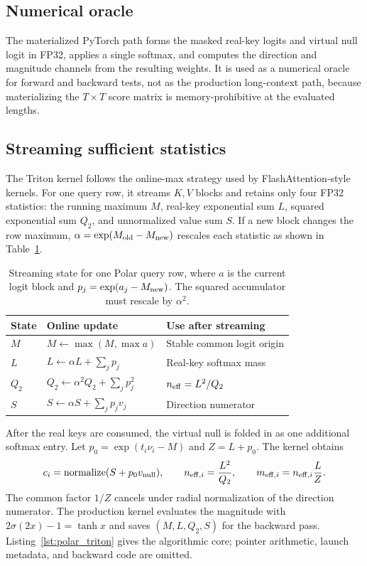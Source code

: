 \subsection{Numerical oracle}
The materialized PyTorch path forms the masked real-key logits and virtual null logit in FP32, applies a single softmax, and computes the direction and magnitude channels from the resulting weights. It is used as a numerical oracle for forward and backward tests, not as the production long-context path, because materializing the $T\times T$ score matrix is memory-prohibitive at the evaluated lengths.

\subsection{Streaming sufficient statistics}
The Triton kernel follows the online-max strategy used by FlashAttention-style kernels. For one query row, it streams $K,V$ blocks and retains only four FP32 statistics: the running maximum $M$, real-key exponential sum $L$, squared exponential sum $Q_2$, and unnormalized value sum $S$. If a new block changes the row maximum, $\alpha=\exp(M_{\rm old}-M_{\rm new})$ rescales each statistic as shown in Table~\ref{table:polar_streaming_state}.

\begin{table}[!ht]
\centering
\small
\begin{tabular}{lll}
\toprule
\textbf{State} & \textbf{Online update} & \textbf{Use after streaming} \\
\midrule
$M$ & $M\leftarrow\max(M,\max a)$ & Stable common logit origin \\
$L$ & $L\leftarrow\alpha L+\sum_jp_j$ & Real-key softmax mass \\
$Q_2$ & $Q_2\leftarrow\alpha^2Q_2+\sum_jp_j^2$ & $n_{\rm eff}=L^2/Q_2$ \\
$S$ & $S\leftarrow\alpha S+\sum_jp_jv_j$ & Direction numerator \\
\bottomrule
\end{tabular}
\caption{Streaming state for one Polar query row, where $a$ is the current logit block and $p_j=\exp(a_j-M_{\rm new})$. The squared accumulator must rescale by $\alpha^2$.}
\label{table:polar_streaming_state}
\end{table}

After the real keys are consumed, the virtual null is folded in as one additional softmax entry. Let $p_0=\exp(t_i\nu_i-M)$ and $Z=L+p_0$. The kernel obtains
\begin{equation}
c_i=\operatorname{normalize}(S+p_0v_{\rm null}),\qquad
n_{{\rm eff},i}=\frac{L^2}{Q_2},\qquad
m_{{\rm eff},i}=n_{{\rm eff},i}\frac{L}{Z}.
\end{equation}
The common factor $1/Z$ cancels under radial normalization of the direction numerator. The production kernel evaluates the magnitude with $2\sigma(2x)-1=\tanh x$ and saves $(M,L,Q_2,S)$ for the backward pass. Listing~\ref{lst:polar_triton} gives the algorithmic core; pointer arithmetic, launch metadata, and backward code are omitted.


